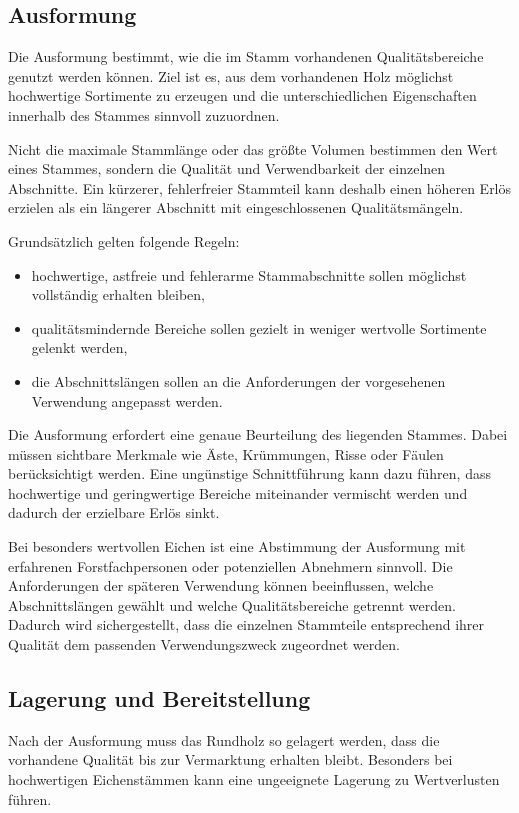 \documentclass[twocolumn, bibliography=totoc, abstract=true]{scrartcl}
\begin{document}
\subsection{Ausformung}

Die Ausformung bestimmt, wie die im Stamm vorhandenen Qualitätsbereiche genutzt werden können. Ziel ist es, aus dem vorhandenen Holz möglichst hochwertige Sortimente zu erzeugen und die unterschiedlichen Eigenschaften innerhalb des Stammes sinnvoll zuzuordnen.

Nicht die maximale Stammlänge oder das größte Volumen bestimmen den Wert eines Stammes, sondern die Qualität und Verwendbarkeit der einzelnen Abschnitte. Ein kürzerer, fehlerfreier Stammteil kann deshalb einen höheren Erlös erzielen als ein längerer Abschnitt mit eingeschlossenen Qualitätsmängeln.

Grundsätzlich gelten folgende Regeln:

\begin{itemize}
\item hochwertige, astfreie und fehlerarme Stammabschnitte sollen möglichst vollständig erhalten bleiben,
\item qualitätsmindernde Bereiche sollen gezielt in weniger wertvolle Sortimente gelenkt werden,
\item die Abschnittslängen sollen an die Anforderungen der vorgesehenen Verwendung angepasst werden.
\end{itemize}

Die Ausformung erfordert eine genaue Beurteilung des liegenden Stammes. Dabei müssen sichtbare Merkmale wie Äste, Krümmungen, Risse oder Fäulen berücksichtigt werden. Eine ungünstige Schnittführung kann dazu führen, dass hochwertige und geringwertige Bereiche miteinander vermischt werden und dadurch der erzielbare Erlös sinkt.

Bei besonders wertvollen Eichen ist eine Abstimmung der Ausformung mit erfahrenen Forstfachpersonen oder potenziellen Abnehmern sinnvoll. Die Anforderungen der späteren Verwendung können beeinflussen, welche Abschnittslängen gewählt und welche Qualitätsbereiche getrennt werden. Dadurch wird sichergestellt, dass die einzelnen Stammteile entsprechend ihrer Qualität dem passenden Verwendungszweck zugeordnet werden.

\subsection{Lagerung und Bereitstellung}

Nach der Ausformung muss das Rundholz so gelagert werden, dass die vorhandene Qualität bis zur Vermarktung erhalten bleibt. Besonders bei hochwertigen Eichenstämmen kann eine ungeeignete Lagerung zu Wertverlusten führen.
\end{document}
